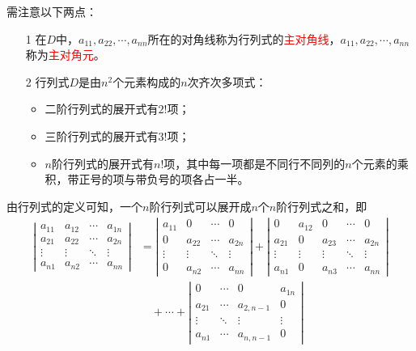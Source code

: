 \documentclass[10pt,a4paper%
tablecaptionabove]{article}
\newcommand{\red}{\textcolor{red}}
\begin{document}
\begin{CJK}{UTF8}{gkai}
  \begin{zhu}
    需注意以下两点：
    \begin{enumerate}
    \item[1]
      在$D$中，$a_{11},a_{22},\cdots,a_{nn}$所在的对角线称为行列式的\red{主对角线}，$a_{11},a_{22},\cdots,a_{nn}$称为\red{主对角元}。
    \item[2]
      行列式$D$是由$n^2$个元素构成的$n$次齐次多项式：
      \begin{itemize}
      \item 二阶行列式的展开式有$2!$项；
      \item 三阶行列式的展开式有$3!$项；
      \item $n$阶行列式的展开式有$n!$项，其中每一项都是不同行不同列的$n$个元素的乘积，带正号的项与带负号的项各占一半。
      \end{itemize}      
    \end{enumerate}    
  \end{zhu}
  由行列式的定义可知，一个$n$阶行列式可以展开成$n$个$n$阶行列式之和，即
  $$
  \begin{aligned}
    \left|
      \begin{array}{cccc}
        a_{11}  &  a_{12} & \cdots & a_{1n} \\
        a_{21}  &  a_{22} & \cdots & a_{2n} \\
        \vdots & \vdots & \ddots & \vdots\\  
        a_{n1}  &  a_{n2} & \cdots & a_{nn} 
      \end{array}
    \right| &= 
    \left|
      \begin{array}{cccc}
        a_{11}  &  0 & \cdots & 0 \\
        0  &  a_{22} & \cdots & a_{2n} \\
        \vdots & \vdots & \ddots & \vdots\\  
        0  &  a_{n2} & \cdots & a_{nn} 
      \end{array}
    \right|  + \left|
      \begin{array}{ccccc}
        0  &  a_{12} & 0 & \cdots & 0 \\
        a_{21} & 0  &  a_{23} & \cdots & a_{2n} \\
        \vdots & \vdots & \vdots & \ddots & \vdots\\  
        a_{n1}  & 0&  a_{n3} & \cdots & a_{nn} 
      \end{array}
    \right| \\[0.1in]
    & \quad + \cdots  
    + 
    \left|
      \begin{array}{cccc}
        0 & \cdots & 0 & a_{1n} \\
        a_{21}  &   \cdots & a_{2,n-1} & 0 \\
        \vdots &  \ddots & \vdots & \vdots\\  
        a_{n1}  &   \cdots & a_{n,n-1} & 0
      \end{array}
    \right| 
  \end{aligned}
  $$


\end{CJK}
\end{document}
